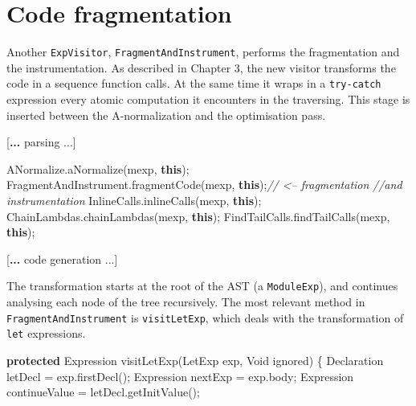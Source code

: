 \documentclass[12pt,a4paper,oneside,openright]{book}
\newenvironment{Shaded}{\begin{snugshade}}{\end{snugshade}}
\newcommand{\KeywordTok}[1]{\textcolor[rgb]{0.13,0.29,0.53}{\textbf{{#1}}}}
\newcommand{\CommentTok}[1]{\textcolor[rgb]{0.56,0.35,0.01}{\textit{{#1}}}}
\newcommand{\FunctionTok}[1]{\textcolor[rgb]{0.00,0.00,0.00}{{#1}}}
\newcommand{\NormalTok}[1]{{#1}}
\begin{document}
\section{Code fragmentation}\label{code-fragmentation-1}

Another \texttt{ExpVisitor}, \texttt{FragmentAndInstrument}, performs
the fragmentation and the instrumentation. As described in Chapter 3,
the new visitor transforms the code in a sequence function calls. At the
same time it wraps in a \texttt{try-catch} expression every atomic
computation it encounters in the traversing. This stage is inserted
between the A-normalization and the optimisation pass.

\begin{Shaded}
\begin{Highlighting}[]
\NormalTok{[}\KeywordTok{... }\NormalTok{parsing ...]}

\NormalTok{ANormalize.}\FunctionTok{aNormalize}\NormalTok{(mexp, }\KeywordTok{this}\NormalTok{);}
\NormalTok{FragmentAndInstrument.}\FunctionTok{fragmentCode}\NormalTok{(mexp, }\KeywordTok{this}\NormalTok{);}\CommentTok{// <-- fragmentation}
                                              \CommentTok{//and instrumentation}
\NormalTok{InlineCalls.}\FunctionTok{inlineCalls}\NormalTok{(mexp, }\KeywordTok{this}\NormalTok{);}
\NormalTok{ChainLambdas.}\FunctionTok{chainLambdas}\NormalTok{(mexp, }\KeywordTok{this}\NormalTok{);}
\NormalTok{FindTailCalls.}\FunctionTok{findTailCalls}\NormalTok{(mexp, }\KeywordTok{this}\NormalTok{);}

\NormalTok{[}\KeywordTok{... }\NormalTok{code generation ...]}
\end{Highlighting}
\end{Shaded}

The transformation starts at the root of the AST (a \texttt{ModuleExp}),
and continues analysing each node of the tree recursively. The most
relevant method in \texttt{FragmentAndInstrument} is
\texttt{visitLetExp}, which deals with the transformation of
\texttt{let} expressions.

\begin{Shaded}
\begin{Highlighting}[]
\KeywordTok{protected} \NormalTok{Expression }\FunctionTok{visitLetExp}\NormalTok{(LetExp exp, Void ignored) \{}
    \NormalTok{Declaration letDecl = exp.}\FunctionTok{firstDecl}\NormalTok{();}
    \NormalTok{Expression nextExp = exp.}\FunctionTok{body}\NormalTok{;}
    \NormalTok{Expression continueValue = letDecl.}\FunctionTok{getInitValue}\NormalTok{();}
\end{Highlighting}
\end{Shaded}
\end{document}
